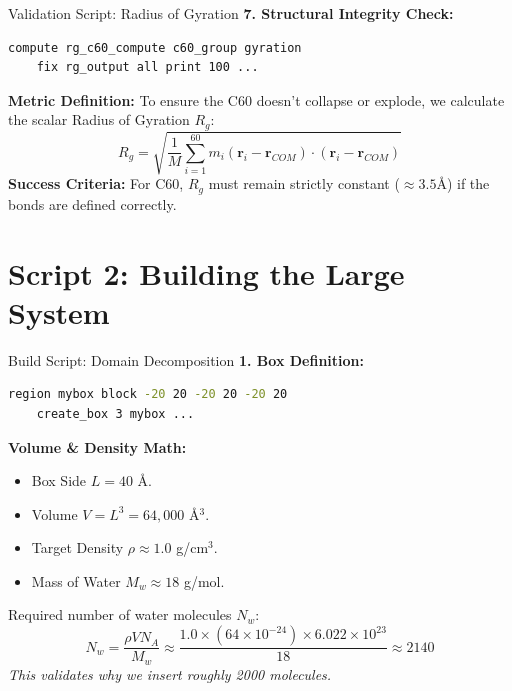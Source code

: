 \documentclass[aspectratio=169, 10pt]{beamer}
\begin{document}
\begin{frame}[fragile]{Validation Script: Radius of Gyration}
    \textbf{7. Structural Integrity Check:}
    \begin{lstlisting}[language=bash]
    compute rg_c60_compute c60_group gyration
    fix rg_output all print 100 ...
    \end{lstlisting}

    \textbf{Metric Definition:}
    To ensure the C60 doesn't collapse or explode, we calculate the scalar Radius of Gyration $R_g$:
    \begin{equation}
        R_g = \sqrt{ \frac{1}{M} \sum_{i=1}^{60} m_i (\mathbf{r}_i - \mathbf{r}_{COM}) \cdot (\mathbf{r}_i - \mathbf{r}_{COM}) }
    \end{equation}
    \textbf{Success Criteria:} For C60, $R_g$ must remain strictly constant ($\approx 3.5$\AA) if the bonds are defined correctly.
\end{frame}

\section{Script 2: Building the Large System}

\begin{frame}[fragile]{Build Script: Domain Decomposition}
    \textbf{1. Box Definition:}
    \begin{lstlisting}[language=bash]
    region mybox block -20 20 -20 20 -20 20
    create_box 3 mybox ...
    \end{lstlisting}
    
    \textbf{Volume \& Density Math:}
    \begin{itemize}
        \item Box Side $L = 40$ \AA.
        \item Volume $V = L^3 = 64,000$ \AA$^3$.
        \item Target Density $\rho \approx 1.0$ g/cm$^3$.
        \item Mass of Water $M_w \approx 18$ g/mol.
    \end{itemize}
    Required number of water molecules $N_w$:
    \begin{equation}
        N_w = \frac{\rho V N_A}{M_w} \approx \frac{1.0 \times (64\times 10^{-24}) \times 6.022\times 10^{23}}{18} \approx 2140
    \end{equation}
    \textit{This validates why we insert roughly 2000 molecules.}
\end{frame}
\end{document}
